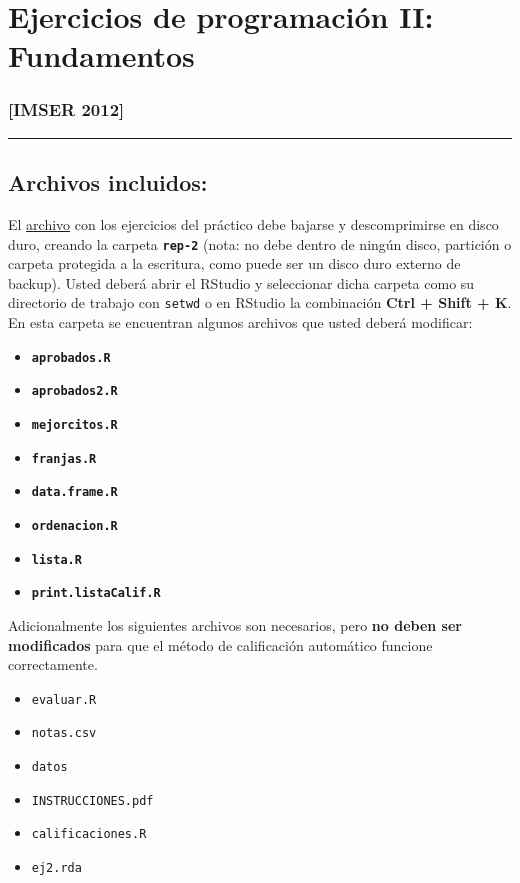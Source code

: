 \documentclass[]{article}
\begin{document}
\section{Ejercicios de programación II: Fundamentos}

\subsubsection{{[}IMSER 2012{]}}

\begin{center}\rule{3in}{0.4pt}\end{center}

\subsection{Archivos incluidos:}

El
\href{http://eva.universidad.edu.uy/file.php/1454/ejercicios\_de\_programacion/rep-1.zip}{archivo}
con los ejercicios del práctico debe bajarse y descomprimirse en disco
duro, creando la carpeta \textbf{\texttt{rep-2}} (nota: no debe dentro
de ningún disco, partición o carpeta protegida a la escritura, como
puede ser un disco duro externo de backup). Usted deberá abrir el
RStudio y seleccionar dicha carpeta como su directorio de trabajo con
\texttt{setwd} o en RStudio la combinación \textbf{Ctrl + Shift + K}. En
esta carpeta se encuentran algunos archivos que usted deberá modificar:

\begin{itemize}
\item
  \textbf{\texttt{aprobados.R}}
\item
  \textbf{\texttt{aprobados2.R}}
\item
  \textbf{\texttt{mejorcitos.R}}
\item
  \textbf{\texttt{franjas.R}}
\item
  \textbf{\texttt{data.frame.R}}
\item
  \textbf{\texttt{ordenacion.R}}
\item
  \textbf{\texttt{lista.R}}
\item
  \textbf{\texttt{print.listaCalif.R}}
\end{itemize}
Adicionalmente los siguientes archivos son necesarios, pero \textbf{no
deben ser modificados} para que el método de calificación automático
funcione correctamente.

\begin{itemize}
\item
  \texttt{evaluar.R}
\item
  \texttt{notas.csv}
\item
  \texttt{datos}
\item
  \texttt{INSTRUCCIONES.pdf}
\item
  \texttt{calificaciones.R}
\item
  \texttt{ej2.rda}
\end{itemize}
\end{document}
